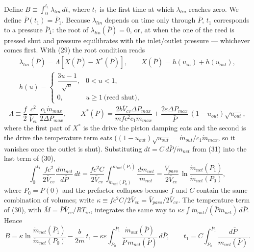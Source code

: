 \documentclass[11pt]{article}
\begin{document}
Define $B \equiv \int_0^{t_1}\lambda_{lin}\,dt$, where $t_1$ is the first time at which $\lambda_{lin}$ reaches zero. We define $\bar P(t_1) = \bar P_1$. Because $\lambda_{lin}$ depends on time only through $\bar P$, $t_1$ corresponds to a pressure $\bar P_1$: the root of $\lambda_{lin}(\bar P) = 0$, or, at when the one of the reed is pressed shut and pressure equilibrates with the inlet/outlet pressure --- whichever comes first. With (29) the root condition reads
\begin{equation}
\begin{gathered}
\lambda_{lin}(\bar P) = \Lambda\left[X(\bar P) - X^*(\bar P)\right], \qquad X(\bar P) = h(u_{in}) + h(u_{out}), \\
h(u) = \begin{cases} \dfrac{3u-1}{\sqrt u}, & 0 < u < 1, \\[6pt] 0, & u \ge 1 \ \text{(reed shut)}, \end{cases}
\end{gathered} \tag{32a}
\end{equation}
\begin{equation}
\Lambda \equiv \frac{f}{2}\,\frac{c^2}{\bar V_{cv}}\,\frac{c_1\dot m_{max}}{2\Delta P_{max}}, \qquad
X^*(\bar P) = \frac{2b\bar V_{cv}\Delta P_{max}}{mfc^2c_1\dot m_{max}} + \frac{2\varepsilon\Delta P_{max}}{\bar P}\,(1 - u_{out})\sqrt{u_{out}} , \tag{32b}
\end{equation}
where the first part of $X^*$ is the drive the piston damping eats and the second is the drive the temperature term eats ($(1 - u_{out})\sqrt{u_{out}} = \dot m_{out}/c_1\dot m_{max}$, so it vanishes once the outlet is shut). Substituting $dt = C\,d\bar P/\dot m_{net}$ from (31) into the last term of (30),
\begin{equation}
\int_0^{t_1}\frac{f c^2}{2\bar V_{cv}}\frac{d\dot m_{net}}{d\bar P}\,dt = \frac{f c^2 C}{2\bar V_{cv}}\int_{\dot m_{net}(P_0)}^{\dot m_{net}(\bar P_1)}\frac{d\dot m_{net}}{\dot m_{net}} = \frac{\bar V_{pass}}{2\bar V_{cv}}\,\ln\frac{\dot m_{net}(\bar P_1)}{\dot m_{net}(P_0)}, \tag{32}
\end{equation}
where $P_0 = \bar P(0)$ and the prefactor collapses because $f$ and $C$ contain the same combination of volumes; write $\kappa \equiv fc^2C/2\bar V_{cv} = \bar V_{pass}/2\bar V_{cv}$. The temperature term of (30), with $\bar M = \bar P\bar V_{cv}/RT_{in}$, integrates the same way to $\kappa\varepsilon\int\dot m_{out}/(\bar P\dot m_{net})\,d\bar P$. Hence
\begin{equation}
B = \kappa\ln\frac{\dot m_{net}(\bar P_1)}{\dot m_{net}(P_0)} - \frac{b}{2m}\,t_1 - \kappa\varepsilon\int_{P_0}^{\bar P_1}\frac{\dot m_{out}(\bar P)}{\bar P\,\dot m_{net}(\bar P)}\,d\bar P, \qquad t_1 = C\int_{P_0}^{\bar P_1}\frac{d\bar P}{\dot m_{net}(\bar P)} . \tag{33}
\end{equation}
\end{document}
